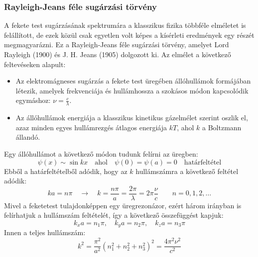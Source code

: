 \documentclass[../main.tex]{subfiles}
\begin{document}
\subsubsection{Rayleigh-Jeans féle sugárzási törvény}
A fekete test sugárzásának spektrumára a klasszikus fizika többféle elméletet is felállított, de ezek közül csak egyetlen volt képes a kísérleti eredmények egy részét megmagyarázni. Ez a Rayleigh-Jeans féle sugárzási törvény, amelyet Lord Rayleigh (1900) és J. H. Jeans (1905) dolgozott ki. Az elmélet a következő feltevéseken alapult:
\begin{itemize}
    \item Az elektromágneses sugárzás a fekete test üregében állóhullámok formájában létezik, amelyek frekvenciája és hullámhossza a szokásos módon kapcsolódik egymáshoz: $\nu = \frac{c}{\lambda}$.
    \item Az állóhullámok energiája a klasszikus kinetikus gázelmélet szerint oszlik el, azaz minden egyes hullámrezgés átlagos energiája $kT$, ahol $k$ a Boltzmann állandó.
\end{itemize}

Egy állóhullámot a következő módon tudunk felírni az üregben:
\begin{equation}
    \psi(x) \sim \sin kx \quad \text{ahol} \quad \psi(0) = \psi(a) = 0 \quad \text{határfeltétel}
\end{equation}
Ebből a határfeltételből adódik, hogy az $k$ hullámszámra a következő feltétel adódik:
\begin{equation}
    ka = n\pi \quad \rightarrow \quad k = \frac{n\pi}{a} = \frac{2 \pi}{\lambda} = 2\pi \frac{\nu}{c} \qquad n = 0, 1, 2, \ldots
\end{equation}
Mivel a feketetest tulajdonképpen egy üregrezonázor, ezért három irányban is felírhatjuk a hullámszám feltételét, így a következő összefüggést kapjuk:
\begin{equation}
    k_xa = n_1 \pi, \quad k_y a = n_2 \pi, \quad k_z a = n_3 \pi
\end{equation}
Innen a teljes hullámszám:
\begin{equation}
    k^2 = \frac{\pi^2}{a^2} (n_1^2 + n_2^2 + n_3^2)^2 = \frac{4 \pi^2 \nu^2}{c^2}
\end{equation}
\end{document}
